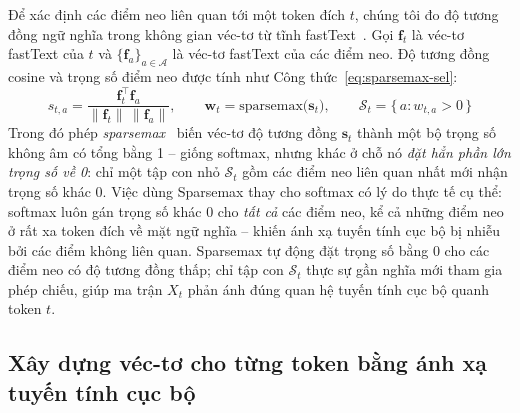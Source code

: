 Để xác định các điểm neo liên quan tới một token đích $t$, chúng tôi đo độ tương đồng ngữ nghĩa
trong không gian véc-tơ từ tĩnh fastText~\cite{bojanowski2017fasttext, grave2018fasttext}. Gọi
$\mathbf{f}_t$ là véc-tơ fastText của $t$ và $\{\mathbf{f}_a\}_{a\in\mathcal{A}}$ là véc-tơ
fastText của các điểm neo. Độ tương đồng cosine và trọng số điểm neo được tính như
Công thức~\eqref{eq:sparsemax-sel}:
\begin{equation}
  \label{eq:sparsemax-sel}
  s_{t,a} = \frac{\mathbf{f}_t^\top \mathbf{f}_a}{\lVert \mathbf{f}_t\rVert\, \lVert \mathbf{f}_a\rVert},
  \qquad
  \mathbf{w}_t = \mathrm{sparsemax}\big(\mathbf{s}_t\big),
  \qquad
  \mathcal{S}_t = \{\, a : w_{t,a} > 0 \,\}
\end{equation}
Trong đó phép \textit{sparsemax}~\cite{martins2016sparsemax} biến véc-tơ độ tương đồng
$\mathbf{s}_t$ thành một bộ trọng số không âm có tổng bằng 1 -- giống softmax, nhưng khác ở chỗ nó
\textit{đặt hẳn phần lớn trọng số về 0}: chỉ một tập con nhỏ $\mathcal{S}_t$ gồm các điểm neo liên quan
nhất mới nhận trọng số khác 0. Việc dùng Sparsemax thay cho softmax có lý do thực tế cụ thể:
softmax luôn gán trọng số khác 0 cho \textit{tất cả} các điểm neo, kể cả những điểm neo ở rất xa token
đích về mặt ngữ nghĩa -- khiến ánh xạ tuyến tính cục bộ bị nhiễu bởi các điểm không liên
quan. Sparsemax tự động đặt trọng số bằng 0 cho các điểm neo có độ tương đồng thấp; chỉ tập con
$\mathcal{S}_t$ thực sự gần nghĩa mới tham gia phép chiếu, giúp ma trận $X_t$ phản ánh đúng
quan hệ tuyến tính cục bộ quanh token $t$.

\subsection{Xây dựng véc-tơ cho từng token bằng ánh xạ tuyến tính cục bộ}
\label{subsec:local-map}

